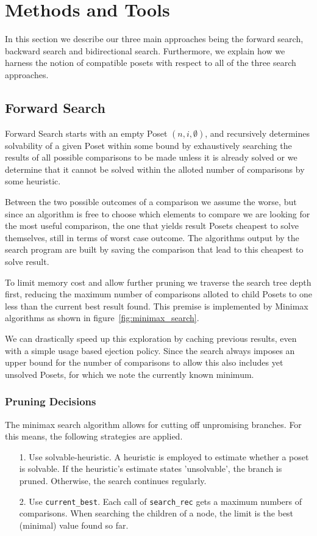 \documentclass[10pt,journal,compsoc]{IEEEtran}
\begin{document}
\section{Methods and Tools}
In this section we describe our three main approaches being the forward search, backward search and bidirectional search. Furthermore, we explain how we harness the notion of compatible posets with respect to all of the three search approaches.

\subsection{Forward Search}\label{chapter:forward_search}
Forward Search starts with an empty Poset $(n,i,\emptyset)$,
and recursively determines solvability of a given Poset within some bound by exhaustively searching
the results of all possible comparisons to be made unless it is already solved or we determine that
it cannot be solved within the alloted number of comparisons by some heuristic.

Between the two possible outcomes of a comparison we assume the worse, but since an algorithm is
free to choose which elements to compare we are looking for the most useful comparison, the one that
yields result Posets cheapest to solve themselves, still in terms of worst case outcome. The
algorithms output by the search program are built by saving the comparison that lead to this
cheapest to solve result.

To limit memory cost and allow further pruning we traverse the search tree depth first, reducing the
maximum number of comparisons alloted to child Posets to one less than the current best result
found. This premise is implemented by Minimax algorithms as shown in
figure~\ref{fig:minimax_search}.

We can drastically speed up this exploration by caching previous results, even with a simple usage
based ejection policy. Since the search always imposes an upper bound for the number of comparisons
to allow this also includes yet unsolved Posets, for which we note the currently known minimum.

\subsubsection{Pruning Decisions}
The minimax search algorithm allows for cutting off unpromising branches. For this means, the following strategies are applied.

\begin{enumerate}
  \item[1.]
    Use solvable-heuristic. A heuristic is employed to estimate whether a poset is solvable. If the heuristic's estimate states 'unsolvable', the branch is pruned.
    Otherwise, the search continues regularly.
  \item[2.]
    Use \texttt{current\_best}. Each call of \texttt{search\_rec} gets a maximum numbers of comparisons.
    When searching the children of a node, the limit is the best (minimal) value found so far.
\end{enumerate}
\end{document}
